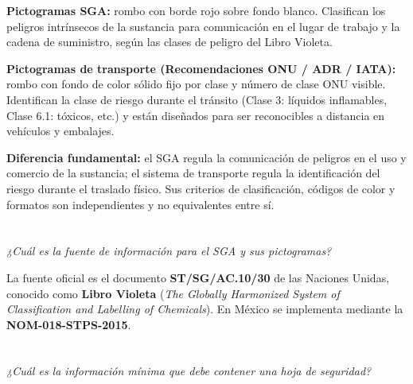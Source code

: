 \vspace{0.3cm}
\textbf{Pictogramas SGA:} rombo con borde rojo sobre fondo blanco. Clasifican los peligros intrínsecos de la sustancia para comunicación en el lugar de trabajo y la cadena de suministro, según las clases de peligro del Libro Violeta.

\textbf{Pictogramas de transporte (Recomendaciones ONU / ADR / IATA):} rombo con fondo de color sólido fijo por clase y número de clase ONU visible. Identifican la clase de riesgo durante el tránsito (Clase 3: líquidos inflamables, Clase 6.1: tóxicos, etc.) y están diseñados para ser reconocibles a distancia en vehículos y embalajes.

\textbf{Diferencia fundamental:} el SGA regula la comunicación de peligros en el uso y comercio de la sustancia; el sistema de transporte regula la identificación del riesgo durante el traslado físico. Sus criterios de clasificación, códigos de color y formatos son independientes y no equivalentes entre sí.


{}
\section*{\centering\fontsize{12}{18}}

\textit{¿Cuál es la fuente de información para el SGA y sus pictogramas?}

\vspace{0.3cm}
La fuente oficial es el documento \textbf{ST/SG/AC.10/30} de las Naciones Unidas, conocido como \textbf{Libro Violeta} (\textit{The Globally Harmonized System of Classification and Labelling of Chemicals}). En México se implementa mediante la \textbf{NOM-018-STPS-2015}.


{}
\section*{\centering\fontsize{12}{18}}

\textit{¿Cuál es la información mínima que debe contener una hoja de seguridad?}

